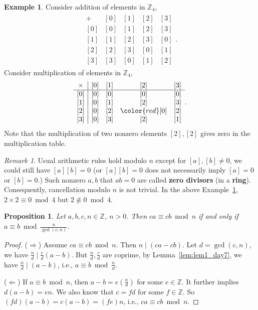 \documentclass{amsbook}
\theoremstyle{plain}
\newtheorem{proposition}[theorem]{Proposition}
\theoremstyle{definition}
\newtheorem{example}[theorem]{Example}
\theoremstyle{remark}
\newtheorem{remark}[theorem]{Remark}
\numberwithin{equation}{chapter}
\numberwithin{figure}{chapter}
\newcommand{\Z}{\mathbb{Z}}
\begin{document}
\begin{example}\label{ex:z4}
  Consider addition of elements in $\Z_4$,
  \begin{align}
    \begin{array}{c|cccc}
       +  & [0] & [1] & [2] & [3] \\[0mm]\hline
      [0] & [0] & [1] & [2] & [3] \\[0mm] 
      [1] & [1] & [2] & [3] & [0] \\[0mm]
      [2] & [2] & [3] & [0] & [1] \\[0mm]
      [3] & [3] & [0] & [1] & [2]
    \end{array}.
  \end{align}
  Consider multiplication of elements in $\Z_4$,
  \begin{align}
    \begin{array}{c|cccc}
  \times  & [0] & [1] & [2] & [3] \\[0mm]\hline
      [0] & [0] & [0] & [0] & [0] \\[0mm] 
      [1] & [0] & [1] & [2] & [3] \\[0mm]
      [2] & [0] & [2] & {\color{red}[0]} & [2] \\[0mm]
      [3] & [0] & [3] & [2] & [1]
    \end{array}.
  \end{align}
Note that the multiplication of two nonzero elements $[2], [2]$ gives zero in the multiplication table.
\end{example}
\begin{remark}
  Usual arithmetic rules hold modulo $n$ except for $[a], [b] \neq 0$, we could still have $[a][b]=0$ (or $[a][b] = 0$ does not necessarily imply $[a] = 0$ or $[b] = 0$.) Such nonzero $a, b$ that $ab = 0$ are called \textbf{zero divisors} (in a \textbf{ring}). Consequently, cancellation modulo $n$ is not trivial. In the above Example~\ref{ex:z4}, $2 \times 2 \equiv 0 \bmod 4$ but $2 \not\equiv 0 \bmod 4$.
\end{remark}

\begin{proposition}\label{prop:cong_cancel}
  Let $a, b, c, n \in \Z$, $n > 0$. Then $ca \equiv cb \bmod n$ if and only if $a \equiv b \bmod \frac{n}{\gcd (c, n)}$.
\end{proposition}
\begin{proof}
($\Rightarrow$) Assume $ca \equiv cb \bmod n$. Then $n \mid (ca - cb)$. Let $d = \gcd(c, n)$, we have $\frac{n}d \mid \frac{c}d (a - b)$. But $\frac{n}d, \frac{c}d$ are coprime, by Lemma~\ref{lem:lem1_day7}, we have $\frac{n}d \mid (a - b)$, i.e., $a \equiv b \bmod \frac{n}d$.

($\Leftarrow$) If $a \equiv b \bmod n$, then $a - b = e \left( \frac{n}d \right)$ for some $e \in \Z$. It further implies $d(a - b) = en$. We also know that $c = fd$ for some $f \in \Z$. So $(fd)(a - b) = c(a - b) = (fe)n$, i.e., $ca \equiv cb \bmod n$.
\end{proof}
\end{document}

